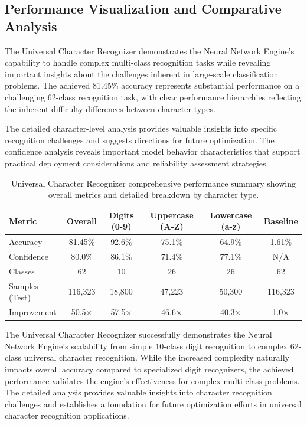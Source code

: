 \documentclass[11pt,a4paper]{report}
\begin{document}
\subsection{Performance Visualization and Comparative Analysis}

The Universal Character Recognizer demonstrates the Neural Network Engine's capability to handle complex multi-class recognition tasks while revealing important insights about the challenges inherent in large-scale classification problems. The achieved 81.45\% accuracy represents substantial performance on a challenging 62-class recognition task, with clear performance hierarchies reflecting the inherent difficulty differences between character types.

The detailed character-level analysis provides valuable insights into specific recognition challenges and suggests directions for future optimization. The confidence analysis reveals important model behavior characteristics that support practical deployment considerations and reliability assessment strategies.

\begin{table}[H]
\centering
\caption{Universal Character Recognizer comprehensive performance summary showing overall metrics and detailed breakdown by character type.}
\label{tab:universal_performance}
\begin{tabular}{lccccc}
\toprule
Metric & Overall & Digits (0-9) & Uppercase (A-Z) & Lowercase (a-z) & Baseline \\
\midrule
Accuracy & 81.45\% & 92.6\% & 75.1\% & 64.9\% & 1.61\% \\
Confidence & 80.0\% & 86.1\% & 71.4\% & 77.1\% & N/A \\
Classes & 62 & 10 & 26 & 26 & 62 \\
Samples (Test) & 116,323 & 18,800 & 47,223 & 50,300 & 116,323 \\
Improvement & 50.5× & 57.5× & 46.6× & 40.3× & 1.0× \\
\bottomrule
\end{tabular}
\end{table}

The Universal Character Recognizer successfully demonstrates the Neural Network Engine's scalability from simple 10-class digit recognition to complex 62-class universal character recognition. While the increased complexity naturally impacts overall accuracy compared to specialized digit recognizers, the achieved performance validates the engine's effectiveness for complex multi-class problems. The detailed analysis provides valuable insights into character recognition challenges and establishes a foundation for future optimization efforts in universal character recognition applications.
\end{document}
